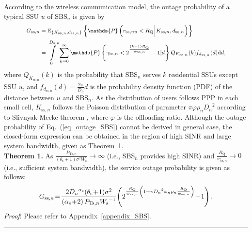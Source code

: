 \documentclass[12pt, draftclsnofoot,onecolumn]{IEEEtran}
\begin{document}
According to the wireless communication model, the outage probability of a typical SSU $u$ of SBS$_n$ is given by
        \begin{equation}\label{eq_outage_SBS}\footnotesize
            \begin{split}
            G_{\mathrm{ss},n} & = \mathbb{E}_{\{K_{\mathrm{ss},n}, d_{\mathrm{ss},n}\}} \left\{ \mathds{P} \left( r_{\mathrm{ss},nu} < R_\mathrm{Q} \Big| K_{\mathrm{ss},n}, d_{\mathrm{ss},n} \right) \right\}\\
            & = \int\limits_0\limits^{D_{\mathrm{s},n}} \sum\limits_{k=0}\limits^{\infty} \mathds{P}\left\{ \gamma_{\mathrm{ss},n} < 2^{\frac{(k+1)R_\mathrm{Q}}{w_{\mathrm{ss},n}}} - 1 | d \right\} Q_{K_{\mathrm{ss},n}}(k) f_{d_{\mathrm{ss},n}}(d) \mathrm{d} d ,
            \end{split}
        \end{equation}
where $Q_{K_{\mathrm{ss},n}}(k)$ is the probability that SBS$_n$ serves $k$ residential SSUs except SSU $u$, and $f_{d_{\mathrm{ss},n}}(d) = \frac{2 \pi}{D_{n}} d$ is the probability density function (PDF) of the distance between $u$ and SBS$_n$.
As the distribution of users follows PPP in each small cell, $K_{\mathrm{ss},n}$ follows the Poisson distribution of parameter $\pi \varphi \rho_{n} {D_{n}}^2$ according to Slivnyak-Mecke theorem \cite{Slivnyak_theorem}, where $\varphi$ is the offloading ratio.
Although the outage probability of Eq.~(\ref{eq_outage_SBS}) cannot be derived in general case, the closed-form expression can be obtained in the region of high SINR and large system bandwidth, given as Theorem~1.\\

    \textbf{Theorem 1.} As $\frac{P_{\mathrm{Ts},n}} {(\theta_\mathrm{s}+1)\sigma^2 W_\mathrm{s}}\rightarrow \infty$ (i.e., SBS$_n$ provides high SINR) and $\frac{R_\mathrm{Q}} {w_{\mathrm{ss},n}} \rightarrow 0$ (i.e., sufficient system bandwidth), the service outage probability is given as follows:
            \begin{equation}\label{eq_outage_SBS_closed_2}\footnotesize
                G_{\mathrm{ss},n} \!=\! \frac{2 {D_{n}}^{\alpha_\mathrm{s}} (\theta_\mathrm{s}\!+\!1)\sigma^2 }{  \left(\alpha_\mathrm{s}\!+\!2\right) P_{\mathrm{Ts},n} {W_\mathrm{s}}^{-1}} \! \left(2^{\frac{R_\mathrm{Q}}{w_{\mathrm{ss},n}}\left(1 + \pi {D_{n}}^2 \varphi_n \rho_{n} \frac{R_\mathrm{Q}}{w_{\mathrm{ss},n}} \right)}\!-\!1\right).
            \end{equation}
    \emph{Proof}: Please refer to Appendix~\ref{appendix_SBS}.
    \hfill \rule{4pt}{8pt}
\end{document}
